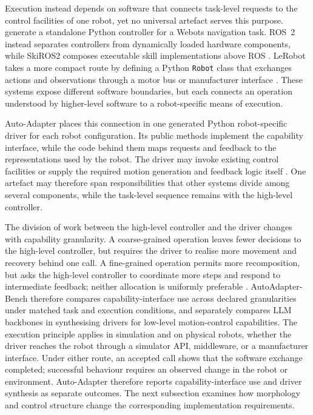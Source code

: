Execution instead depends on software that connects task-level requests to
the control facilities of one robot, yet no universal artefact serves this
purpose. \citet{tripathi2026testdriven} generate a standalone Python
controller for a Webots navigation task. ROS~2 instead separates controllers
from dynamically loaded hardware components, while SkiROS2 composes executable
skill implementations above ROS
\citep{macenski2022ros2,ros2control2026hardware,mayr2023skiros2}.
LeRobot takes a more compact route by defining a Python \texttt{Robot} class
that exchanges actions and observations through a motor bus or manufacturer
interface \citep{lerobot2026hardware}. These systems expose different software
boundaries, but each connects an operation understood by higher-level software
to a robot-specific means of execution.

Auto-Adapter places this connection in one generated Python robot-specific
driver for each robot configuration. Its public methods implement the
capability interface, while the code behind them maps requests and feedback to
the representations used by the robot. The driver may invoke existing control
facilities or supply the required motion generation and feedback logic itself
\citep{lynch2017modern}. One artefact may therefore span responsibilities that
other systems divide among several components, while the task-level sequence
remains with the high-level controller.

The division of work between the high-level controller and the driver changes
with capability granularity. A coarse-grained operation leaves fewer decisions
to the high-level controller, but requires the driver to realise more movement
and recovery behind one call. A fine-grained operation permits more
recomposition, but asks the high-level controller to coordinate more steps and
respond to intermediate feedback; neither allocation is uniformly preferable
\citep{zech2019action,pantano2022capabilitysurvey}. AutoAdapter-Bench therefore
compares capability-interface use across declared granularities under matched
task and execution conditions, and separately compares LLM backbones in
synthesising drivers for low-level motion-control capabilities. The execution
principle applies in simulation and on physical robots, whether the driver
reaches the robot through a simulator API, middleware, or a manufacturer
interface. Under either route, an accepted call shows that the software
exchange completed; successful behaviour requires an observed change in the
robot or environment. Auto-Adapter therefore reports capability-interface use
and driver synthesis as separate outcomes. The next subsection examines how
morphology and control structure change the corresponding implementation
requirements.

